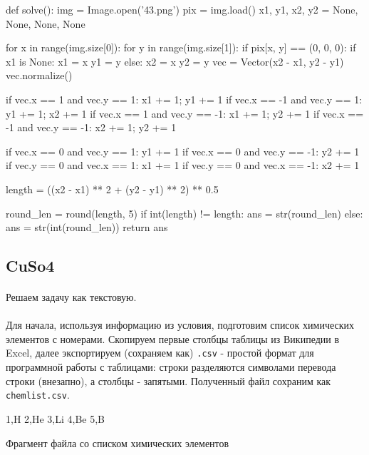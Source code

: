 \documentclass[12pt]{article}
\begin{document}
    \begin{pythoncode}
def solve():
    img = Image.open('43.png')
    pix = img.load()
    x1, y1, x2, y2 = None, None, None, None

    for x in range(img.size[0]):
        for y in range(img.size[1]):
            if pix[x, y] == (0, 0, 0):
                if x1 is None:
                    x1 = x
                    y1 = y
                else:
                    x2 = x
                    y2 = y
    vec = Vector(x2 - x1, y2 - y1)
    vec.normalize()

    if vec.x == 1 and vec.y == 1: x1 += 1; y1 += 1
    if vec.x == -1 and vec.y == 1: y1 += 1; x2 += 1
    if vec.x == 1 and vec.y == -1: x1 += 1; y2 += 1
    if vec.x == -1 and vec.y == -1: x2 += 1; y2 += 1

    if vec.x == 0 and vec.y == 1: y1 += 1
    if vec.x == 0 and vec.y == -1: y2 += 1
    if vec.y == 0 and vec.x == 1: x1 += 1
    if vec.y == 0 and vec.x == -1: x2 += 1

    length = ((x2 - x1) ** 2 + (y2 - y1) ** 2) ** 0.5

    round_len = round(length, 5)
    if int(length) != length:
        ans = str(round_len)
    else:
        ans = str(int(round_len))
    return ans
    \end{pythoncode}

    \subsection{CuSo4}
    \paragraph{}
    Решаем задачу как текстовую.
    \paragraph{}
    Для начала, используя информацию из условия, подготовим список химических элементов с номерами.
    Скопируем первые столбцы таблицы из Википедии в Excel, далее экспортируем (сохраняем как) \verb|.csv| -
    простой формат для программной работы с таблицами: строки разделяются символами перевода строки (внезапно),
    а столбцы - запятыми.
    Полученный файл сохраним как \verb|chemlist.csv|.
    \begin{listing}[H]
        \begin{pythoncode}
1,H
2,He
3,Li
4,Be
5,B
        \end{pythoncode}
        \caption{Фрагмент файла со списком химических элементов}
        \label{lst:chemlist}
    \end{listing}
\end{document}
